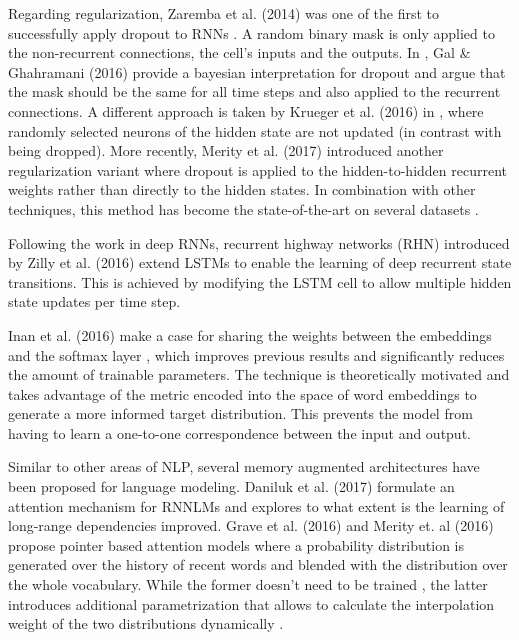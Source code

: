 Regarding regularization, Zaremba et al. (2014) was one of the first to successfully apply dropout to RNNs \cite{zaremba2014recurrent}. A random binary mask is only applied to the non-recurrent connections, the cell's inputs and the outputs. In \cite{gal2016theoretically}, Gal \& Ghahramani (2016) provide a bayesian interpretation for dropout and argue that the mask should be the same for all time steps and also applied to the recurrent connections. A different approach is taken by Krueger et al. (2016) in \cite{krueger2016zoneout}, where randomly selected neurons of the hidden state are not updated (in contrast with being dropped). More recently, Merity et al. (2017) introduced another regularization variant where dropout is applied to the hidden-to-hidden recurrent weights rather than directly to the hidden states. In combination with other techniques, this method has become the state-of-the-art on several datasets \cite{merity2017regularizing}.

Following the work in deep RNNs, recurrent highway networks (RHN) \cite{zilly2016recurrent} introduced by Zilly et al. (2016) extend LSTMs to enable the learning of deep recurrent state transitions. This is achieved by modifying the LSTM cell to allow multiple hidden state updates per time step.

Inan et al. (2016) make a case for sharing the weights between the embeddings and the softmax layer \cite{inan2016tying}, which improves previous results and significantly reduces the amount of trainable parameters. The technique is theoretically motivated and takes advantage of the metric encoded into the space of word embeddings to generate a more informed target distribution. This prevents the model from having to learn a one-to-one correspondence between the input and output.

Similar to other areas of NLP, several memory augmented architectures have been proposed for language modeling. Daniluk et al. (2017) formulate an attention mechanism for RNNLMs \cite{daniluk2017frustratingly} and explores to what extent is the learning of long-range dependencies improved. Grave et al. (2016) and Merity et. al (2016) propose pointer based attention models where a probability distribution is generated over the history of recent words and blended with the distribution over the whole vocabulary. While the former doesn't need to be trained \cite{grave2016improving}, the latter introduces additional parametrization that allows to calculate the interpolation weight of the two distributions dynamically \cite{merity2016pointer}.

